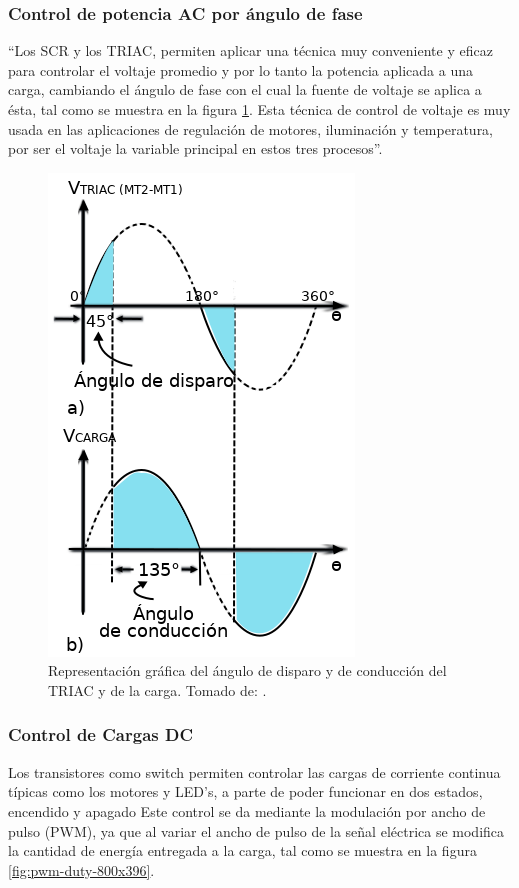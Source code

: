 \subsubsection{Control de potencia AC por ángulo de fase}

``Los SCR y los TRIAC, permiten aplicar una técnica muy conveniente y eficaz para controlar el voltaje promedio y por lo tanto la potencia aplicada a una carga, cambiando el ángulo de fase con el cual la fuente de voltaje se aplica a ésta, tal como se muestra en la figura \ref{fig:triacgraph}. Esta técnica de control de voltaje es muy usada en las aplicaciones de regulación de motores, iluminación y temperatura, por ser el voltaje la variable principal en estos tres procesos''.\cite{CEKIT}\\


\begin{figure}[!t]
	\centering
	\caption{Representación gráfica del ángulo de disparo y de conducción del TRIAC y de la carga. Tomado de: \cite{CEKIT}.}
	\label{fig:triacgraph}
	\includegraphics[width=0.4\linewidth]{Imagenes/TRIAC_graph}
\end{figure}

\subsubsection{Control de Cargas DC}

Los transistores como switch permiten controlar las cargas de corriente continua típicas como los motores y LED's, a parte de poder funcionar en dos estados, encendido y apagado Este control se da mediante la modulación por ancho de pulso (PWM), ya que al variar el ancho de pulso de la señal eléctrica se modifica la cantidad de energía entregada a la carga, tal como se muestra en la figura \ref{fig:pwm-duty-800x396}. \cite{PWM}\\

